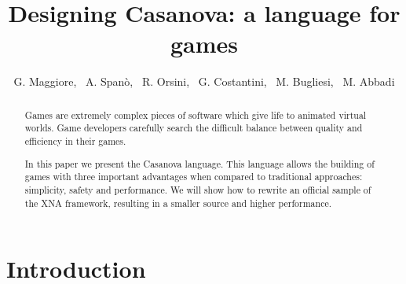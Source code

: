 \documentclass{llncs}
\begin{document}
\title{Designing Casanova: a language for games}

\author{
G. Maggiore, \ A. Span\`o, \ R. Orsini, \ G. Costantini, \ M. Bugliesi, \ M. Abbadi \\[1mm]
}


\date{}

\maketitle

\begin{abstract}
Games are extremely complex pieces of software which give life to animated virtual worlds. Game developers carefully search the difficult balance between quality and efficiency in their games.

In this paper we present the Casanova language. This language allows the building of games with three important advantages when compared to traditional approaches: simplicity, safety and performance. We will show how to rewrite an official sample of the XNA framework, resulting in a smaller source and higher performance.
\end{abstract}

\begin{comment}
\category{D.1.1}{Programming Techniques}{Applicative (Functional) Programming} 
\category{D.2.2}{Soft\-ware Engineering}{Software Libraries}[Design Tools and Techniques]
\category{D.2.13}{Soft\-ware Engineering}{Reusable Software}[Domain engineering, Reusable libraries, Reuse models]
\category{D.3.3}{Programming Languages}{Language Constructs and Features}
\category{D.3.4}{Pro\-gramming Languages}{Processors}[Optimization, Run-time environments]
\category{H.5.1}{Information Systems}{Information Interfaces and Presentation}[Multimedia Information Systems]

\terms{Games,Performance,Languages}

\keywords{games, optimization}
\end{comment}

\section{Introduction}
\label{sec:introduction}
 
\end{document}
